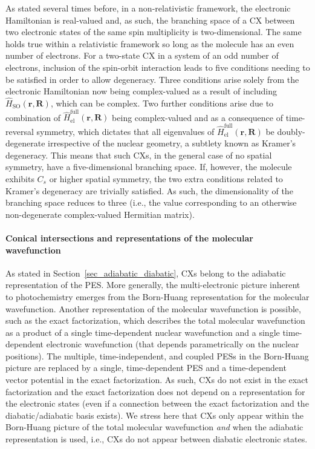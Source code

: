 \documentclass[9pt,bestpractices,pubversion]{livecoms}
\newcommand{\R}{\mathbf{R}}
\newcommand{\re}{\mathbf{r}}
\begin{document}
As stated several times before, in a non-relativistic framework, the electronic Hamiltonian is real-valued and, as such, the branching space of a CX between two electronic states of the same spin multiplicity is two-dimensional.
The same holds true within a relativistic framework so long as the molecule has an even number of electrons.
For a two-state CX in a system of an odd number of electrons, inclusion of the spin-orbit interaction leads to five conditions needing to be satisfied in order to allow degeneracy.\cite{matsika2001effects1, matsika2001effects2, matsika2002spin, han2003properties}
Three conditions arise solely from the electronic Hamiltonian now being complex-valued as a result of including $\hat{H}_{\text{SO}}(\re,\R)$, which can be complex.\cite{mead1979noncrossing}
Two further conditions arise due to combination of $\hat{H}_{\text{el}}^\text{full}(\re,\R)$ being complex-valued and as a consequence of time-reversal symmetry, which dictates that all eigenvalues of $\hat{H}_{\text{el}}^\text{full}(\re,\R)$ be doubly-degenerate irrespective of the nuclear geometry, a subtlety known as Kramer’s degeneracy.\cite{kramers1930theorie}
This means that such CXs, in the general case of no spatial symmetry, have a five-dimensional branching space.
If, however, the molecule exhibits $C_s$ or higher spatial symmetry, the two extra conditions related to Kramer’s degeneracy are trivially satisfied.
As such, the dimensionality of the branching space reduces to three (i.e., the value corresponding to an otherwise non-degenerate complex-valued Hermitian matrix).\cite{matsika2001effects1}

\paragraph{Conical intersections and representations of the molecular wavefunction}
As stated in Section~\ref{sec_adiabatic_diabatic}, CXs belong to the adiabatic representation of the PES. More generally, the multi-electronic picture inherent to photochemistry emerges from the Born-Huang representation for the molecular wavefunction. Another representation of the molecular wavefunction is possible, such as the exact factorization, which describes the total molecular wavefunction as a product of a single time-dependent nuclear wavefunction and a single time-dependent electronic wavefunction (that depends parametrically on the nuclear positions).\cite{abedi_exact_2010,abedi_correlated_2012} The multiple, time-independent, and coupled PESs in the Born-Huang picture are replaced by a single, time-dependent PES and a time-dependent vector potential in the exact factorization.\cite{abedisteps} As such, CXs do not exist in the exact factorization\cite{curchod_dynamics_2017,agostini_when_2018} and the exact factorization does not depend on a representation for the electronic states (even if a connection between the exact factorization and the diabatic/adiabatic basis exists\cite{schurger2025efbh}). We stress here that CXs only appear within the Born-Huang picture of the total molecular wavefunction \textit{and} when the adiabatic representation is used, i.e., CXs do not appear between diabatic electronic states.
\end{document}
